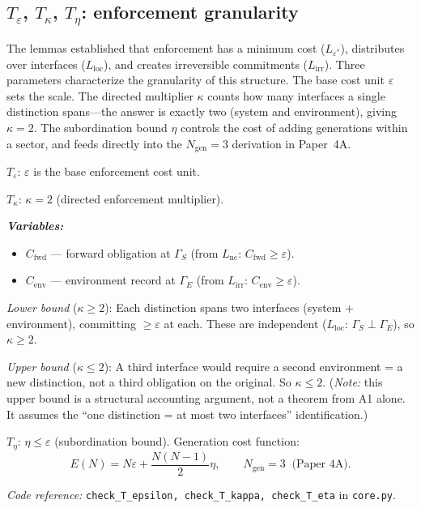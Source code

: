 \documentclass[11pt]{article}
\newenvironment{varlist}{\begin{itemize}[nosep,leftmargin=2em]}{\end{itemize}}
\newcommand{\coderef}[2]{\smallskip\noindent\textit{Code reference:} \texttt{#1} in \texttt{#2}.}
\begin{document}
\subsection{\texorpdfstring{$T_\varepsilon$, $T_\kappa$, $T_\eta$}{T epsilon, T kappa, T eta}: enforcement granularity}

The lemmas established that enforcement has a minimum cost ($L_{\varepsilon^*}$), distributes over interfaces ($L_{\mathrm{loc}}$), and creates irreversible commitments ($L_{\mathrm{irr}}$).  Three parameters characterize the granularity of this structure.  The base cost unit $\varepsilon$ sets the scale.  The directed multiplier $\kappa$ counts how many interfaces a single distinction spans---the answer is exactly two (system and environment), giving $\kappa = 2$.  The subordination bound $\eta$ controls the cost of adding generations within a sector, and feeds directly into the $N_{\mathrm{gen}} = 3$ derivation in Paper~4A.

\begin{tcolorbox}[apfbox, title={$T_\varepsilon$, $T_\kappa$, $T_\eta$: Enforcement Granularity Parameters}]
\textit{$T_\varepsilon$}: $\varepsilon$ is the base enforcement cost unit.

\smallskip
\textit{$T_\kappa$}: $\kappa = 2$ (directed enforcement multiplier).

\smallskip\noindent\textbf{\textit{Variables:}}
\begin{varlist}
\item $C_{\mathrm{fwd}}$ --- forward obligation at $\Gamma_S$ (from $L_{\mathrm{nc}}$: $C_{\mathrm{fwd}} \ge \varepsilon$).
\item $C_{\mathrm{env}}$ --- environment record at $\Gamma_E$ (from $L_{\mathrm{irr}}$: $C_{\mathrm{env}} \ge \varepsilon$).
\end{varlist}

\textit{Lower bound} ($\kappa \ge 2$): Each distinction spans two interfaces (system + environment), committing $\ge \varepsilon$ at each.  These are independent ($L_{\mathrm{loc}}$: $\Gamma_S \perp \Gamma_E$), so $\kappa \ge 2$.

\textit{Upper bound} ($\kappa \le 2$): A third interface would require a second environment = a new distinction, not a third obligation on the original.  So $\kappa \le 2$.  (\textit{Note:} this upper bound is a structural accounting argument, not a theorem from A1 alone.  It assumes the ``one distinction = at most two interfaces'' identification.)

\smallskip
\textit{$T_\eta$}: $\eta \le \varepsilon$ (subordination bound).  Generation cost function:
\begin{equation}
E(N) = N\varepsilon + \frac{N(N-1)}{2}\eta, \qquad N_{\mathrm{gen}} = 3 \;\;\text{(Paper~4A)}.
\end{equation}

\coderef{check\_T\_epsilon, check\_T\_kappa, check\_T\_eta}{core.py}
\end{tcolorbox}
\end{document}
